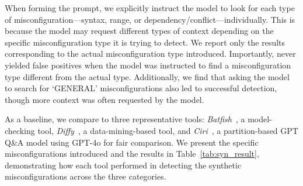 When forming the prompt, we explicitly instruct the model to look for each type of misconfiguration—syntax, range, or dependency/conflict—individually. This is because the model may request different types of context depending on the specific misconfiguration type it is trying to detect. We report only the results corresponding to the actual misconfiguration type introduced. Importantly, \sysname{} never yielded false positives when the model was instructed to find a misconfiguration type different from the actual type. Additionally, we find that asking the model to search for `GENERAL' misconfigurations also led to successful detection, though more context was often requested by the model.

As a baseline, we compare \sysname{} to three representative tools: \textit{Batfish}~\cite{fogel2015general}, a model-checking tool, \textit{Diffy}~\cite{kakarla2024diffy}, a data-mining-based tool, and \textit{Ciri}~\cite{lian2023configuration}, a partition-based GPT Q\&A model using GPT-4o for fair comparison. We present the specific misconfigurations introduced and the results in Table~\ref{tab:syn_result}, demonstrating how each tool performed in detecting the synthetic misconfigurations across the three categories.

\begin{table}[ht]
\centering
\caption{Synthetic Misconfiguration Detection Results:}
\end{table}

